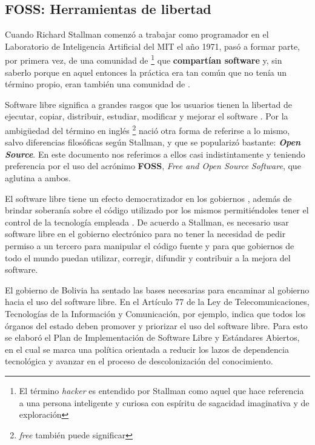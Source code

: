\subsection{FOSS: Herramientas de libertad}

Cuando Richard Stallman comenzó a trabajar como programador en el Laboratorio de Inteligencia Artificial del MIT el año 1971, 
pasó a formar parte, por primera vez, de una comunidad de 
\footnote{El término \textit{hacker} es entendido por Stallman como aquel que hace referencia a una persona inteligente y curiosa con espíritu de sagacidad imaginativa y de exploración}
que \textbf{compartían software} y, sin saberlo porque en aquel entonces la práctica era tan común que no tenía un término propio, eran también una comunidad de  \cite{stallmanSoftwareLibrePara}.

Software libre significa a grandes rasgos que los usuarios tienen la libertad de ejecutar, copiar, distribuir, estudiar, modificar y mejorar el software \cite{QueEsSoftware}.
Por la ambigüedad del término en inglés
\footnote{\textit{free} también puede significar } 
nació otra forma de referirse a lo mismo, salvo diferencias filosóficas según Stallman\cite{WhyOpenSource}, y que se popularizó bastante: \textbf{\textit{Open Source}}. 
En este documento nos referimos a ellos casi indistintamente y teniendo preferencia por el uso del acrónimo \textbf{FOSS}, \textit{Free and Open Source Software}, que aglutina a ambos.

El software libre tiene un efecto democratizador en los gobiernos \cite{donorfioPoliticsFreeOpen2004}, además de brindar soberanía sobre el código utilizado por los mismos permitiéndoles tener el control de la tecnología empleada \cite{LibertadSoftwareSu}. De acuerdo a Stallman, es necesario usar software libre en el gobierno electrónico para no tener la necesidad de pedir permiso a un tercero para manipular el código fuente y para que gobiernos de todo el mundo puedan utilizar, corregir, difundir y contribuir a la mejora del software\cite{SoftwareLibreGobierno}.

El gobierno de Bolivia ha sentado las bases necesarias para encaminar al gobierno hacia el uso del software libre. 
En el Artículo 77 de la Ley de Telecomunicaciones, Tecnologías de la Información y Comunicación, por ejemplo, indica que todos los órganos del estado deben promover y priorizar el uso del software libre\cite{Ley164Ley2011}.
Para esto se elaboró el Plan de Implementación de Software Libre y Estándares Abiertos, en el cual se marca una política orientada a reducir los lazos de dependencia tecnológica y avanzar en el proceso de descolonización del conocimiento\cite{PLANIMPLEMENTACIONSOFTWARE}.
